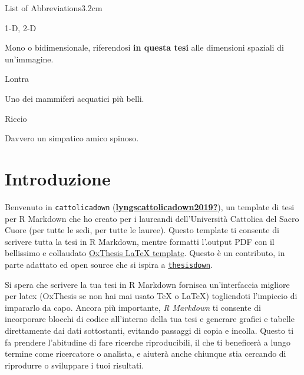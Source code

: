 \documentclass[a4paper, 11pt, nobind]{templates/ociamthesis}
\begin{document}
\begin{romanpages}
\begin{mclistof}{List of Abbreviations}{3.2cm}
\item[1-D, 2-D]

Mono o bidimensionale, riferendosi \textbf{in questa tesi} alle dimensioni spaziali di un'immagine.

\item[Lontra]

Uno dei mammiferi acquatici più belli.

\item[Riccio]

Davvero un simpatico amico spinoso.

\end{mclistof} 


\end{romanpages}

\flushbottom

\hypertarget{introduzione}{%
\chapter*{Introduzione}\label{introduzione}}

\adjustmtc
{}

Benvenuto in \texttt{cattolicadown} (\protect\hyperlink{ref-lyngscattolicadown2019}{\textbf{lyngscattolicadown2019?}}), un template di tesi per R Markdown che ho creato per i laureandi dell'Università Cattolica del Sacro Cuore (per tutte le sedi, per tutte le lauree).
Questo template ti consente di scrivere tutta la tesi in R Markdown, mentre formatti l'.output PDF con il bellissimo e collaudato \href{https://github.com/mcmanigle/OxThesis}{OxThesis LaTeX template}.
Questo è un contributo, in parte adattato ed open source che si ispira a \href{https://github.com/ismayc/thesisdown}{\texttt{thesisdown}}.

Si spera che scrivere la tua tesi in R Markdown fornisca un'interfaccia migliore per latex (OxThesis se non hai mai usato TeX o LaTeX) togliendoti l'impiccio di impararlo da capo.
Ancora più importante, \emph{R Markdown} ti consente di incorporare blocchi di codice all'interno della tua tesi e generare grafici e tabelle direttamente dai dati sottostanti, evitando passaggi di copia e incolla.
Questo ti fa prendere l'abitudine di fare ricerche riproducibili, il che ti beneficerà a lungo termine come ricercatore o analista, e aiuterà anche chiunque stia cercando di riprodurre o sviluppare i tuoi risultati.
\end{document}
